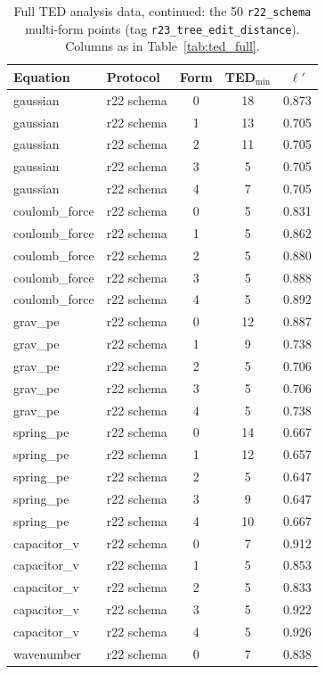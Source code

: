 \begin{table}[h]
\centering
\footnotesize
\caption{Full TED analysis data, continued: the 50 \texttt{r22\_schema} multi-form points (tag \texttt{r23\_tree\_edit\_distance}). Columns as in Table~\ref{tab:ted_full}.}
\label{tab:ted_full_schema}
\begin{tabular}{llccc}
\toprule
Equation & Protocol & Form & TED$_{\min}$ & $\ell'$ \\
\midrule
gaussian & r22 schema & 0 & 18 & 0.873 \\
gaussian & r22 schema & 1 & 13 & 0.705 \\
gaussian & r22 schema & 2 & 11 & 0.705 \\
gaussian & r22 schema & 3 & 5 & 0.705 \\
gaussian & r22 schema & 4 & 7 & 0.705 \\
coulomb\_force & r22 schema & 0 & 5 & 0.831 \\
coulomb\_force & r22 schema & 1 & 5 & 0.862 \\
coulomb\_force & r22 schema & 2 & 5 & 0.880 \\
coulomb\_force & r22 schema & 3 & 5 & 0.888 \\
coulomb\_force & r22 schema & 4 & 5 & 0.892 \\
grav\_pe & r22 schema & 0 & 12 & 0.887 \\
grav\_pe & r22 schema & 1 & 9 & 0.738 \\
grav\_pe & r22 schema & 2 & 5 & 0.706 \\
grav\_pe & r22 schema & 3 & 5 & 0.706 \\
grav\_pe & r22 schema & 4 & 5 & 0.738 \\
spring\_pe & r22 schema & 0 & 14 & 0.667 \\
spring\_pe & r22 schema & 1 & 12 & 0.657 \\
spring\_pe & r22 schema & 2 & 5 & 0.647 \\
spring\_pe & r22 schema & 3 & 9 & 0.647 \\
spring\_pe & r22 schema & 4 & 10 & 0.667 \\
capacitor\_v & r22 schema & 0 & 7 & 0.912 \\
capacitor\_v & r22 schema & 1 & 5 & 0.853 \\
capacitor\_v & r22 schema & 2 & 5 & 0.833 \\
capacitor\_v & r22 schema & 3 & 5 & 0.922 \\
capacitor\_v & r22 schema & 4 & 5 & 0.926 \\
wavenumber & r22 schema & 0 & 7 & 0.838 \\

\end{tabular}
\end{table}
